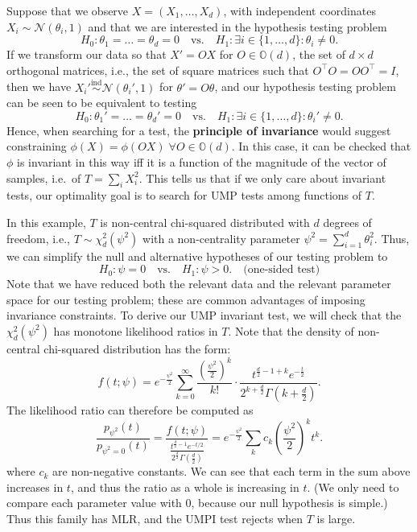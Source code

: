 \begin{exam}
Suppose that we observe $X = (X_1, \ldots, X_d)$, with independent coordinates $X_i \sim \mathcal{N}(\theta_i, 1)$ and that we are interested in the hypothesis testing problem
\[
H_0 : \theta_1 = \ldots = \theta_d = 0 \quad \text{vs.} \quad H_1 : \exists i \in \{1, \ldots, d\} : \theta_i \neq 0.
\]
If we transform our data so that $X' = OX$ for $O \in \mathbb{O}(d)$, the set of $d \times d$ orthogonal matrices, i.e., the set of square matrices such that $O^\top O = OO^\top = I$, then we have $X_i' \stackrel{\text{ind}}{\sim} \mathcal{N}(\theta_i', 1)$ for $\theta' = O\theta$, and our hypothesis testing problem can be seen to be equivalent to testing
\[
H_0 : \theta_1' = \ldots = \theta_d' = 0 \quad \text{vs.} \quad H_1 : \exists i \in \{1, \ldots, d\} : \theta_i' \neq 0.
\]
Hence, when searching for a test, the \textbf{principle of invariance} would suggest constraining $\phi(X) = \phi(OX) \; \forall O \in \mathbb{O}(d)$. In this case, it can be checked that $\phi$ is invariant in this way iff it is a function of the magnitude of the vector of samples, i.e.\ of $T = \sum_i X_i^2$. This tells us that if we only care about invariant tests, our optimality goal is to search for UMP tests among functions of $T$.

In this example, $T$ is non-central chi-squared distributed with $d$ degrees of freedom, i.e., $T \sim \chi_d^2(\psi^2)$ with a non-centrality parameter $\psi^2 = \sum_{i=1}^{d} \theta_i^2$. Thus, we can simplify the null and alternative hypotheses of our testing problem to
\[
H_0 : \psi = 0 \quad \text{vs.} \quad H_1 : \psi > 0. \quad \text{(one-sided test)}
\]
Note that we have reduced both the relevant data and the relevant parameter space for our testing problem; these are common advantages of imposing invariance constraints. To derive our UMP invariant test, we will check that the $\chi_d^2(\psi^2)$ has monotone likelihood ratios in $T$. Note that the density of non-central chi-squared distribution has the form:
\[
f(t; \psi) = e^{-\frac{\psi^2}{2}} \sum_{k=0}^{\infty} \frac{\left(\frac{\psi^2}{2}\right)^k}{k!} \cdot \frac{t^{\frac{d}{2} - 1 + k} e^{-\frac{t}{2}}}{2^{k + \frac{d}{2}} \Gamma\left(k + \frac{d}{2}\right)}.
\]
The likelihood ratio can therefore be computed as
\[
\frac{p_{\psi^2}(t)}{p_{\psi^2 = 0}(t)} = \frac{f(t; \psi)}{\frac{t^{\frac{d}{2} - 1} e^{-t/2}}{2^{\frac{d}{2}} \Gamma\left(\frac{d}{2}\right)}} = e^{-\frac{\psi^2}{2}} \sum_k c_k \left(\frac{\psi^2}{2}\right)^k t^k.
\]
where $c_k$ are non-negative constants. We can see that each term in the sum above increases in $t$, and thus the ratio as a whole is increasing in $t$. (We only need to compare each parameter value with $0$, because our null hypothesis is simple.) Thus this family has MLR, and the UMPI test rejects when $T$ is large.
\end{exam}


